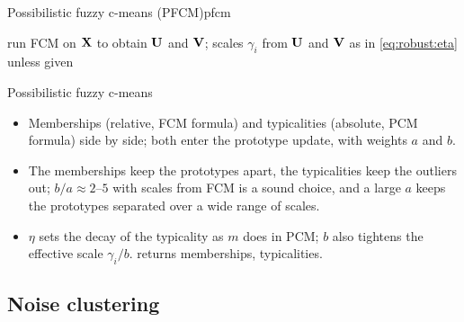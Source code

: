 \begin{algobox}{Possibilistic fuzzy c-means (PFCM)}{pfcm}
\begin{algorithm}[H]
run FCM on $\mathbf{X}$ to obtain $\mathbf{U}$ and $\mathbf{V}$; scales $\gamma_i$ from $\mathbf{U}$ and $\mathbf{V}$ as in \eqref{eq:robust:eta} unless given\;
\end{algorithm}
\end{algobox}
\begin{summarybox}{Possibilistic fuzzy c-means}
\begin{itemize}
  \item Memberships (relative, FCM formula) and typicalities (absolute, PCM formula) side by side; both enter the prototype update, with weights $a$ and $b$.
  \item The memberships keep the prototypes apart, the typicalities keep the outliers out; $b/a\approx2$--$5$ with scales from FCM is a sound choice, and a large $a$ keeps the prototypes separated over a wide range of scales.
  \item $\eta$ sets the decay of the typicality as $m$ does in PCM; $b$ also tightens the effective scale $\gamma_i/b$.  returns memberships,  typicalities.
\end{itemize}
\end{summarybox}

\subsection{Noise clustering}\label{sec:robust:noise}

